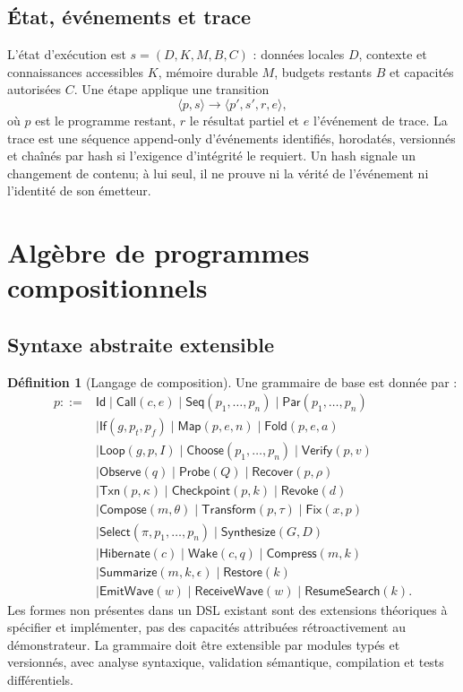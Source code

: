 \documentclass[11pt,a4paper]{article}
\theoremstyle{definition}
\newtheorem{definition}{Définition}[section]
\theoremstyle{plain}
\theoremstyle{remark}
\begin{document}
\subsection{État, événements et trace}
L'état d'exécution est $s=(D,K,M,B,C)$ : données locales $D$, contexte et connaissances accessibles $K$, mémoire durable $M$, budgets restants $B$ et capacités autorisées $C$. Une étape applique une transition
\[
\langle p,s\rangle \longrightarrow \langle p',s',r,e\rangle,
\]
où $p$ est le programme restant, $r$ le résultat partiel et $e$ l'événement de trace. La trace est une séquence append-only d'événements identifiés, horodatés, versionnés et chaînés par hash si l'exigence d'intégrité le requiert. Un hash signale un changement de contenu; à lui seul, il ne prouve ni la vérité de l'événement ni l'identité de son émetteur.

\section{Algèbre de programmes compositionnels}
\subsection{Syntaxe abstraite extensible}
\begin{definition}[Langage de composition]
Une grammaire de base est donnée par :
\begin{align*}
p ::= {} & \mathsf{Id} \mid \mathsf{Call}(c,e) \mid \mathsf{Seq}(p_1,\dots,p_n) \mid \mathsf{Par}(p_1,\dots,p_n) \\
&\mid \mathsf{If}(g,p_t,p_f) \mid \mathsf{Map}(p,e,n) \mid \mathsf{Fold}(p,e,a) \\
&\mid \mathsf{Loop}(g,p,I) \mid \mathsf{Choose}(p_1,\dots,p_n) \mid \mathsf{Verify}(p,v) \\
&\mid \mathsf{Observe}(q) \mid \mathsf{Probe}(Q) \mid \mathsf{Recover}(p,\rho) \\
&\mid \mathsf{Txn}(p,\kappa) \mid \mathsf{Checkpoint}(p,k) \mid \mathsf{Revoke}(d) \\
&\mid \mathsf{Compose}(m,\theta) \mid \mathsf{Transform}(p,\tau) \mid \mathsf{Fix}(x,p)\\
&\mid \mathsf{Select}(\pi,p_1,\dots,p_n) \mid \mathsf{Synthesize}(G,D) \\
&\mid \mathsf{Hibernate}(c) \mid \mathsf{Wake}(c,q) \mid \mathsf{Compress}(m,k) \\
&\mid \mathsf{Summarize}(m,k,\epsilon) \mid \mathsf{Restore}(k) \\
&\mid \mathsf{EmitWave}(w) \mid \mathsf{ReceiveWave}(w) \mid \mathsf{ResumeSearch}(k).
\end{align*}
Les formes non présentes dans un DSL existant sont des extensions théoriques à spécifier et implémenter, pas des capacités attribuées rétroactivement au démonstrateur. La grammaire doit être extensible par modules typés et versionnés, avec analyse syntaxique, validation sémantique, compilation et tests différentiels.
\end{definition}
\end{document}
